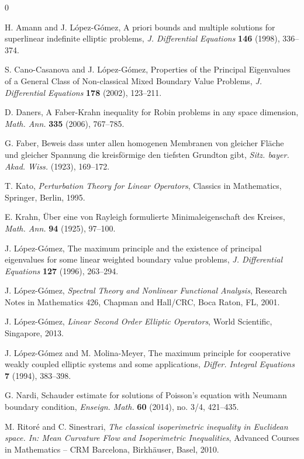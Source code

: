\documentclass[a4paper,11pt,english]{article}
\theoremstyle{plain}
\theoremstyle{definition}
\theoremstyle{remark}
\numberwithin{equation}{section}
\begin{document}
\begin{thebibliography}{0}

 H. Amann and J. L\'opez-G\'omez, A priori bounds and multiple solutions for superlinear indefinite elliptic problems, \emph{J. Differential Equations} \textbf{146} (1998), 336--374.

 S. Cano-Casanova and J. L\'opez-G\'omez,  Properties of the Principal Eigenvalues of a
 General Class of Non-classical Mixed  Boundary Value Problems, \emph{J. Differential Equations} \textbf{178} (2002), 123--211.

D. Daners, A Faber-Krahn inequality for Robin problems in any space dimension, \emph{Math. Ann.} \textbf{335} (2006), 767--785.

G. Faber, Beweis dass unter allen homogenen Membranen von gleicher Fl{\"a}che und
gleicher Spannung die kreisf{\"o}rmige den tiefsten Grundton gibt, \emph{Sitz. bayer. Akad.
Wiss.} (1923), 169--172.

T. Kato, \emph{Perturbation Theory for Linear Operators}, Classics in Mathematics, Springer, Berlin, 1995.

E. Krahn, {\"U}ber eine von Rayleigh formulierte Minimaleigenschaft des Kreises, \emph{Math. Ann.} \textbf{94} (1925), 97--100.

 J. L\'opez-G\'omez, The maximum principle and the existence of principal eigenvalues for some linear
weighted boundary value problems, \emph{J. Differential Equations} \textbf{127} (1996), 263--294.

  J. L\'opez-G\'omez, \emph{Spectral Theory and Nonlinear Functional Analysis}, Research Notes
in Mathematics 426, Chapman and Hall/CRC, Boca Raton, FL, 2001.

J. L\'opez-G\'omez, {\it Linear Second Order Elliptic Operators}, World Scientific, Singapore, 2013.

 J. L\'opez-G\'omez and M. Molina-Meyer, The maximum principle for cooperative weakly coupled
elliptic systems and some applications, \emph{Differ. Integral Equations} \textbf{7} (1994), 383--398.

G. Nardi, Schauder estimate for solutions of Poisson's equation with Neumann boundary condition, \emph{Enseign. Math.} \textbf{60} (2014), no. 3/4, 421--435.

M. Ritor\'e and C. Sinestrari, {\it The classical isoperimetric inequality in Euclidean space. In: Mean Curvature Flow and Isoperimetric Inequalities}, Advanced Courses in Mathematics -- CRM Barcelona, Birkh{\"a}user, Basel, 2010.

\end{thebibliography}
\end{document}
